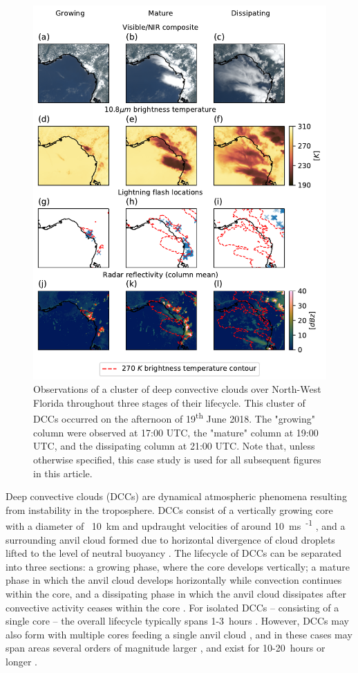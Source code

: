 \documentclass[amt, manuscript]{copernicus}
\begin{document}
\begin{figure}[t]
    \includegraphics[width=12cm]{figure01.pdf}
    \caption{Observations of a cluster of deep convective clouds over North-West Florida throughout three stages of their lifecycle. This cluster of DCCs occurred on the afternoon of 19\textsuperscript{th} June 2018. The "growing" column were observed at 17:00 UTC, the "mature" column at 19:00 UTC, and the dissipating column at 21:00 UTC. Note that, unless otherwise specified, this case study is used for all subsequent figures in this article.}
    \label{fig:compare_sat_radar_glm}
\end{figure}


Deep convective clouds (DCCs) are dynamical atmospheric phenomena resulting from instability in the troposphere.
DCCs consist of a vertically growing core with a diameter of ~10~\unit{km} and updraught velocities of around 10~\unit{ms\textsuperscript{-1}} \citep{weisman_mesoscale_2015}, and a surrounding anvil cloud formed due to horizontal divergence of cloud droplets lifted to the level of neutral buoyancy \citep{houze_chapter_2014}.
The lifecycle of DCCs can be separated into three sections: a growing phase, where the core develops vertically; a mature phase in which the anvil cloud develops horizontally while convection continues within the core, and a dissipating phase in which the anvil cloud dissipates after convective activity ceases within the core \citep{wall_life_2018}.
For isolated DCCs -- consisting of a single core -- the overall lifecycle typically spans 1-3~hours \citep{chen_diurnal_1997}.
However, DCCs may also form with multiple cores feeding a single anvil cloud \citep{roca_simple_2017}, and in these cases may span areas several orders of magnitude larger \citep{houze_mesoscale_2004}, and exist for 10-20~hours or longer \citep{chen_diurnal_1997}.
\end{document}
